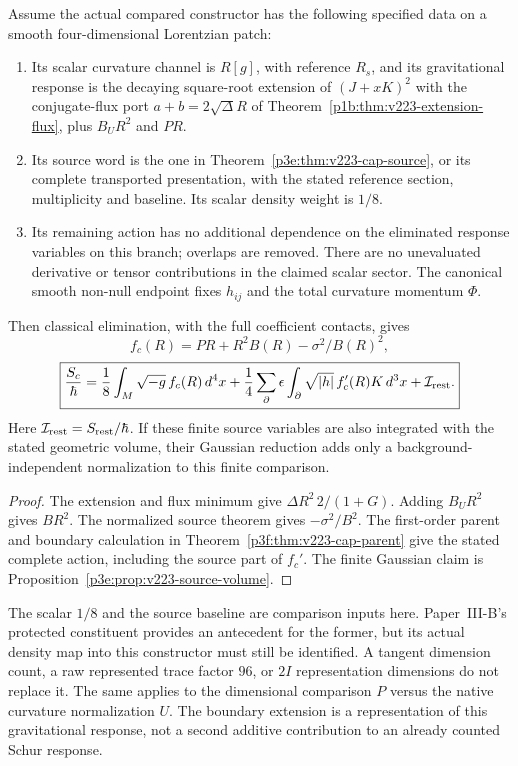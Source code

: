 \documentclass[12pt,a4paper]{article}
\begin{document}
\begin{theorem}
\label{p3e:thm:v223-exact-cap-reduction}
Assume the actual compared constructor has the following specified
data on a smooth four-dimensional Lorentzian patch:
\begin{enumerate}
\item Its scalar curvature channel is $R[g]$, with reference $R_s$,
and its gravitational response is the decaying square-root extension
of $(J+xK)^2$ with the conjugate-flux port
$a+b=2\sqrt\Delta R$ of
Theorem~\ref{p1b:thm:v223-extension-flux}, plus $B_UR^2$ and $PR$.
\item Its source word is the one in
Theorem~\ref{p3e:thm:v223-cap-source}, or its complete transported
presentation, with the stated reference section, multiplicity and
baseline.  Its scalar density weight is $1/8$.
\item Its remaining action has no additional dependence on the
eliminated response variables on this branch; overlaps are removed.
There are no unevaluated derivative or tensor contributions in the
claimed scalar sector.  The canonical smooth non-null endpoint fixes
$h_{ij}$ and the total curvature momentum $\Phi$.
\end{enumerate}
Then classical elimination, with the full coefficient contacts, gives
\[
 \boxed{f_c(R)=PR+R^2B(R)-\sigma^2/B(R)^2,}
\]
\[
 \boxed{\frac{S_c}{\hbar}=
 \frac18\int_M\sqrt{-g}\,f_c(R)\,d^4x
 +\frac14\sum_\partial\epsilon\int_\partial
      \sqrt{|h|}\,f_c'(R)K\,d^3x+\mathcal I_{\rm rest}.}
\]
Here $\mathcal I_{\rm rest}=S_{\rm rest}/\hbar$.
If these finite source variables are also integrated with the stated
geometric volume, their Gaussian reduction adds only a
background-independent normalization to this finite comparison.
\end{theorem}
\begin{proof}
The extension and flux minimum give $\Delta R^2\,2/(1+G)$.
Adding $B_UR^2$ gives $BR^2$.  The normalized source theorem gives
$-\sigma^2/B^2$.  The first-order parent and boundary calculation in
Theorem~\ref{p3f:thm:v223-cap-parent} give the stated complete action,
including the source part of $f_c'$.  The finite Gaussian claim is
Proposition~\ref{p3e:prop:v223-source-volume}.
\end{proof}
The scalar $1/8$ and the source baseline are comparison inputs here.
Paper~III-B's protected constituent provides an antecedent for the
former, but its actual density map into this constructor must still
be identified.  A tangent dimension count, a raw represented trace
factor $96$, or $2I$ representation dimensions do not replace it.
The same applies to the dimensional comparison $P$ versus the native
curvature normalization $U$.  The boundary extension is a
representation of this gravitational response, not a second additive
contribution to an already counted Schur response.
\end{document}
